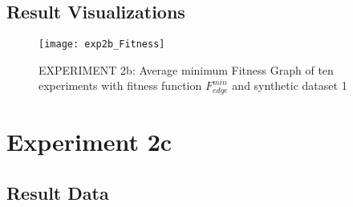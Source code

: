 	\subsection{Result Visualizations}
	\label{sec:A_Exp2b_Diagrams}
		\begin{figure}[H]
			\centering
			\texttt{[image: exp2b\_Fitness]}
			\caption{EXPERIMENT 2b: Average minimum Fitness Graph of ten experiments with fitness function $F_{edge}^{min}$ and synthetic dataset 1}
			\label{fig:exp2bfitness}
		\end{figure}
		
\section{Experiment 2c}
\label{sec:A_Exp2c}
	\subsection{Result Data}
	\label{sec:A_Exp2c_Data}
